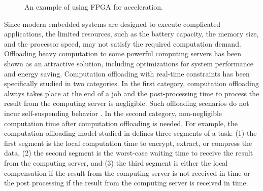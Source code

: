 \begin{figure}[t]
{{}       }
  \caption{An example of using FPGA for acceleration.}
  \label{fig:example-fpga}
\end{figure}


Since modern embedded systems are designed to execute complicated applications, the limited resources, such as the battery capacity, the memory size, and the processor speed, may not satisfy the required computation demand. Offloading heavy computation to some powerful computing servers has been shown as an attractive solution, including optimizations for system performance and energy saving.
Computation offloading with real-time constraints has been specifically studied in two categories. In the first category, computation offloading always takes place at the end of a job and the post-processing time to process the result from the computing server is negligible. Such offloading scenarios do not incur self-suspending behavior  \cite{nimmagadda2010real,DBLP:conf/ecrts/TomaC13}. In the second category, non-negligible computation time after computation offloading is needed. For example, the computation offloading model studied in \cite{Liu_2014} defines three segments of a task: (1) the first segment is the local computation time to encrypt, extract, or compress the data, (2) the second segment is the worst-case waiting time to receive the result from the computing server, and (3) the third segment is either the local compensation if the result from the computing server is not received in time or the post processing if the result from the computing server is received in time. 

